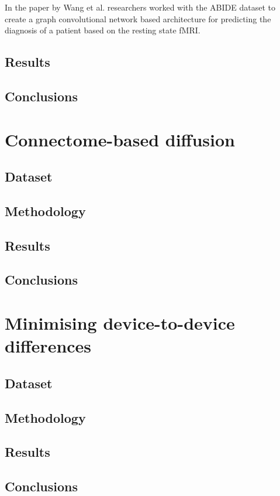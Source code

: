 	In the paper \cite{wang2021graph} by Wang et al. researchers worked with the ABIDE dataset to create a graph convolutional network based architecture for predicting the diagnosis of a patient based on the resting state fMRI. 
	
	\subsection{Results}
	
	\subsection{Conclusions}

\section{Connectome-based diffusion}
\label{sec:diffusion}

	\subsection{Dataset}
	
	\subsection{Methodology}
	
	\subsection{Results}
	
	\subsection{Conclusions}

\section{Minimising device-to-device differences}

	\subsection{Dataset}
	
	\subsection{Methodology}
	
	\subsection{Results}
	
	\subsection{Conclusions}